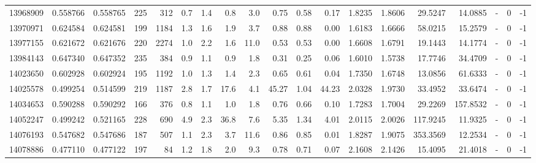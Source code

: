 \begin{tabular}{rrrrrrrrrrrrrrrrlrr}
  13968909 & 0.558766 &   0.558765 &  225 &  312 &      0.7 &      1.4 &     0.8 &      3.0 &       0.75 &        0.58 &        0.17 &  1.8235 &  1.8606 &   29.5247 &   14.0885 &             - &        0 &         -1 \\
  13970971 & 0.624584 &   0.624581 &  199 & 1184 &      1.3 &      1.6 &     1.9 &      3.7 &       0.88 &        0.88 &        0.00 &  1.6183 &  1.6666 &   58.0215 &   15.2579 &             - &        0 &         -1 \\
  13977155 & 0.621672 &   0.621676 &  220 & 2274 &      1.0 &      2.2 &     1.6 &     11.0 &       0.53 &        0.53 &        0.00 &  1.6608 &  1.6791 &   19.1443 &   14.1774 &             - &        0 &         -1 \\
  13984143 & 0.647340 &   0.647352 &  235 &  384 &      0.9 &      1.1 &     0.9 &      1.8 &       0.31 &        0.25 &        0.06 &  1.6010 &  1.5738 &   17.7746 &   34.4709 &             - &        0 &         -1 \\
  14023650 & 0.602928 &   0.602924 &  195 & 1192 &      1.0 &      1.3 &     1.4 &      2.3 &       0.65 &        0.61 &        0.04 &  1.7350 &  1.6748 &   13.0856 &   61.6333 &             - &        0 &         -1 \\
  14025578 & 0.499254 &   0.514599 &  219 & 1187 &      2.8 &      1.7 &    17.6 &      4.1 &      45.27 &        1.04 &       44.23 &  2.0328 &  1.9730 &   33.4952 &   33.6474 &             - &        0 &         -1 \\
  14034653 & 0.590288 &   0.590292 &  166 &  376 &      0.8 &      1.1 &     1.0 &      1.8 &       0.76 &        0.66 &        0.10 &  1.7283 &  1.7004 &   29.2269 &  157.8532 &             - &        0 &         -1 \\
  14052247 & 0.499242 &   0.521165 &  228 &  690 &      4.9 &      2.3 &    36.8 &      7.6 &       5.35 &        1.34 &        4.01 &  2.0115 &  2.0026 &  117.9245 &   11.9325 &             - &        0 &         -1 \\
  14076193 & 0.547682 &   0.547686 &  187 &  507 &      1.1 &      2.3 &     3.7 &     11.6 &       0.86 &        0.85 &        0.01 &  1.8287 &  1.9075 &  353.3569 &   12.2534 &             - &        0 &         -1 \\
  14078886 & 0.477110 &   0.477122 &  197 &   84 &      1.2 &      1.8 &     2.0 &      9.3 &       0.78 &        0.71 &        0.07 &  2.1608 &  2.1426 &   15.4095 &   21.4018 &             - &        0 &         -1 \\

\end{tabular}
